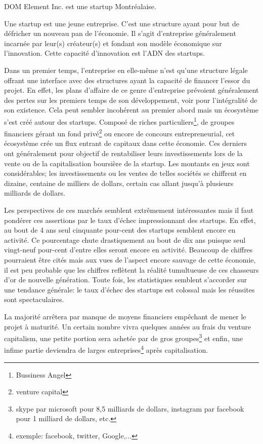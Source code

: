 \documentclass[11pt, a4paper ]{article}
\begin{document}
\begin{spacing}{1.5}
DOM Element Inc. est une startup Montréalaise.

Une startup\cite{theseStartup} est une jeune entreprise. C'est une structure ayant pour but de défricher un nouveau pan de l'économie. Il s'agit d'entreprise généralement incarnée par leur(s) créateur(s) et fondant son modèle économique sur l'innovation. Cette capacité d'innovation est l'ADN des startups.

Dans un premier temps, l'entreprise en elle-même n'est qu'une structure légale offrant une interface avec des structures ayant la capacité de financer l’essor du projet. En effet, les plans d'affaire de ce genre d'entreprise prévoient généralement des pertes sur les premiers temps de son développement, voir pour l'intégralité de son existence. Cela peut sembler incohérent au premier abord mais un écosystème s'est créé autour des startups. Composé de riches particuliers\footnote{Bussiness Angel}, de groupes financiers gérant un fond privé\footnote{venture capital} ou encore de concours entrepreneurial, cet écosystème crée un flux entrant de capitaux dans cette économie. Ces derniers ont généralement pour objectif de rentabiliser leurs investissements lors de la vente ou de la capitalisation boursière de la startup. Les montants en jeux sont considérables; les investissements ou les ventes de telles sociétés se chiffrent en dizaine, centaine de milliers de dollars, certain cas allant jusqu'à plusieurs milliards de dollars.

Les perspectives de ces marchés semblent extrêmement intéressantes mais il faut pondérer ces assertions par le taux d'échec impressionnant des startups. En effet, au bout de 4 ans seul cinquante pour-cent des startups semblent encore en activité. Ce pourcentage chute drastiquement au bout de dix ans puisque seul vingt-neuf pour-cent d'entre elles seront encore en activité.
Beaucoup de chiffres pourraient être cités mais aux vues de l'aspect encore sauvage de cette économie, il est peu probable que les chiffres reflètent la réalité tumultueuse de ces chasseurs d'or de nouvelle génération.
Toute fois, les statistiques semblent s'accorder sur une tendance générale: le taux d'échec des startups est colossal mais les réussites sont spectaculaires.

La majorité arrêtera par manque de moyens financiers empêchant de mener le projet à maturité. Un certain nombre vivra quelques années au frais du venture capitalism, une petite portion sera achetée par de gros groupes\footnote{skype par microsoft pour 8,5 milliards de dollars, instagram par facebook pour 1 milliard de dollars, etc.} et enfin, une infime partie deviendra de larges entreprises\footnote{exemple: facebook, twitter, Google,...} après capitalisation.


\end{spacing}
\end{document}
